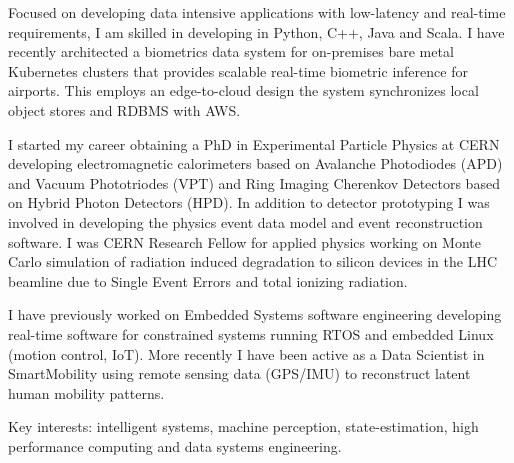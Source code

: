 

\begin{cvparagraph}

Focused on developing data intensive applications with low-latency and real-time requirements, 
I am skilled in developing in Python, C++, Java and Scala. I have recently architected
a biometrics data system for on-premises bare metal Kubernetes clusters that provides 
scalable real-time biometric inference for airports. This employs an edge-to-cloud design
the system synchronizes local object stores and RDBMS with AWS.

I started my career obtaining a PhD in Experimental Particle Physics at CERN developing 
electromagnetic calorimeters based on Avalanche Photodiodes (APD) and 
Vacuum Phototriodes (VPT) and Ring Imaging Cherenkov Detectors based on 
Hybrid Photon Detectors (HPD). In addition to detector prototyping I was 
involved in developing the physics event data model and event reconstruction software. 
I was CERN Research Fellow for applied physics working on Monte Carlo simulation of 
radiation induced degradation to silicon devices in the LHC beamline due to Single Event Errors 
and total ionizing radiation.

I have previously worked on Embedded Systems software engineering developing real-time 
software for constrained systems running RTOS and embedded Linux (motion control, IoT). 
More recently I have been active as a Data Scientist in SmartMobility using 
remote sensing data (GPS/IMU) to reconstruct latent human mobility patterns.

Key interests: intelligent systems, machine perception, state-estimation, 
high performance computing and data systems engineering.
\end{cvparagraph}